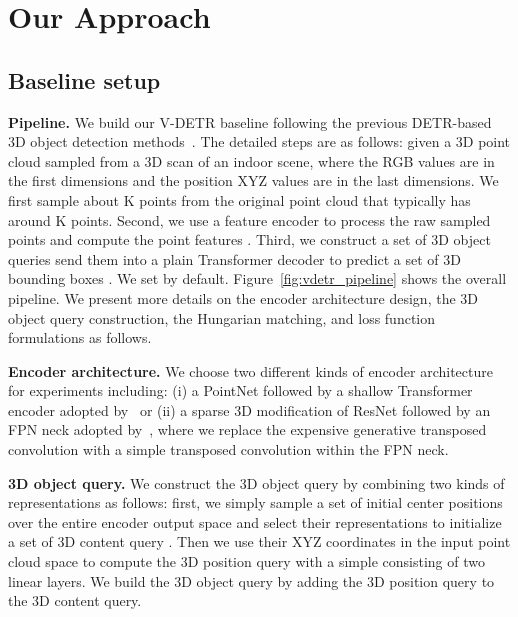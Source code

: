 \documentclass[10pt,twocolumn,letterpaper]{article}
\begin{document}
\section{Our Approach}

\subsection{Baseline setup}

\vspace{1mm}
\noindent\textbf{Pipeline.}
We build our V-DETR baseline following the previous DETR-based 3D object detection methods~\cite{misra2021-3detr,liu2021group}.
The detailed steps are as follows: given a 3D point cloud  sampled from a 3D scan of an indoor scene, where the RGB values are in the first  dimensions and the position XYZ values are in the last  dimensions.
We first sample about {}K points from the original point cloud that typically has around {}K points.
Second, we use a feature encoder to process the raw sampled points and compute the point features .
Third, we construct a set of 3D object queries  send them into a plain Transformer decoder to predict a set of 3D bounding boxes .
We set  by default.
Figure~\ref{fig:vdetr_pipeline} shows the overall pipeline.
We present more details on the encoder architecture design, the 3D object query construction, the Hungarian matching, and loss function formulations as follows.


\vspace{1mm}
\noindent\textbf{Encoder architecture.}
We choose two different kinds of encoder architecture for experiments including:
(i) a PointNet followed by a shallow Transformer encoder adopted by~\cite{misra2021-3detr} or (ii) a sparse 3D modification of ResNet followed by an FPN neck adopted by~\cite{rukhovich2022fcaf3d}, where we replace the expensive generative transposed convolution with a simple transposed convolution within the FPN neck.

\vspace{1mm}
\noindent\textbf{3D object query.}
We construct the 3D object query by combining two kinds of representations as follows: first, we simply sample a set of  initial center positions over the entire encoder output space and select their representations to initialize a set of 3D content query . Then we use their XYZ coordinates in the input point cloud space to compute the 3D position query  with a simple  consisting of two linear layers.
We build the 3D object query by adding the 3D position query to the 3D content query.
\end{document}

